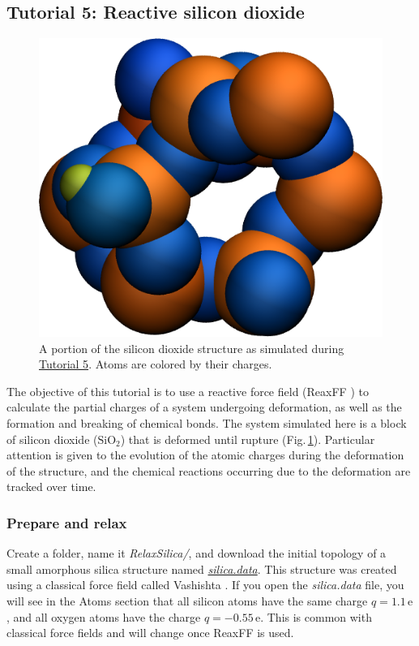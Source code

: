 \documentclass[9pt,tutorial]{livecoms}
\begin{document}
\subsection{Tutorial 5: Reactive silicon dioxide}
\label{reactive-silicon-dioxide-label}

\begin{figure}
\centering
\includegraphics[width=0.55\linewidth]{SIO}
\caption{A portion of the silicon dioxide structure as simulated during \hyperref[reactive-silicon-dioxide-label]{Tutorial 5}. Atoms are colored by their charges.}
\label{fig:SIO}
\end{figure}

\noindent The objective of this tutorial is to use a reactive force field (ReaxFF \cite{van2001reaxff, zou2012investigation}) to calculate the partial charges of a system undergoing deformation, as well as the formation and breaking of chemical bonds. The system simulated here is a block of silicon dioxide ($\text{SiO}_2$) that is deformed until rupture (Fig.\,\ref{fig:SIO}). Particular attention is given to the evolution of the atomic charges during the deformation of the structure, and the chemical reactions occurring due to the deformation are tracked over time.

\subsubsection{Prepare and relax}
Create a folder, name it \textit{RelaxSilica/}, and download the initial topology of a small amorphous silica structure named \href{https://raw.githubusercontent.com/lammpstutorials/lammpstutorials-article/main/files/tutorial5/silica.data}{\textit{silica.data}}. This structure was created using a classical force field called Vashishta \cite{vashishta1990interaction}. If you open the \textit{silica.data} file, you will see in the Atoms section that all silicon atoms have the same charge $q = 1.1\,\text{e}$, and all oxygen atoms have the charge $q = -0.55\,\text{e}$. This is common with classical force fields and will change once ReaxFF is used. 
\end{document}
